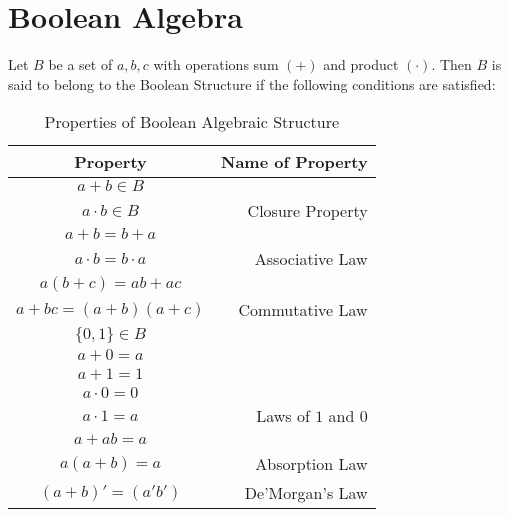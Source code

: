 \documentclass[../main.tex]{subfiles}
\begin{document}
	\chapter{Boolean Algebra}
	Let $B$ be a set of $a,b,c$ with operations sum $(+)$ and product $(\cdot)$.\newline
	Then $B$ is said to belong to the Boolean Structure if the following conditions are satisfied:
	\begin{table*}[!h]
		\caption{Properties of Boolean Algebraic Structure}
		\label{boolean}
		\begin{center}
			\begin{tabular}{c|r}
				Property&Name of Property\\
				\hline
				$a+b \in B$\\$a \cdot b \in B$ & Closure Property\\
				\hline
				$a+b=b+a$\\
				$a \cdot b= b \cdot a$ & Associative Law\\
				\hline
				$a(b+c) = ab + ac $\\
				$a+bc=(a+b)(a+c)$ & Commutative Law\\
				\hline
				$\lbrace 0,1 \rbrace \in B$\\
				$a+0=a$\\
				$a+1=1$\\
				$a \cdot 0=0$\\
				$a \cdot 1=a$ & Laws of $1$ and $0$\\
				\hline
				$a+ab=a$\\
				$a(a+b)=a$ & Absorption Law\\
				\hline
				$(a+b)'=(a'b')$ & De'Morgan's Law
			\end{tabular}
		\end{center}
	\end{table*}
\end{document}

